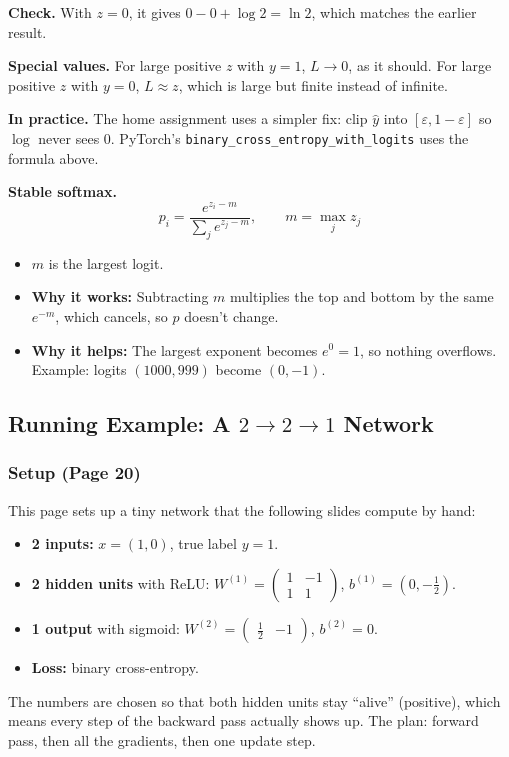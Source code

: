 \textbf{Check.} With $z = 0$, it gives $0 - 0 + \log 2 = \ln 2$, which matches the earlier result.

\textbf{Special values.} For large positive $z$ with $y = 1$, $L \to 0$, as it should. For large positive $z$ with $y = 0$, $L \approx z$, which is large but finite instead of infinite.

\textbf{In practice.} The home assignment uses a simpler fix: clip $\hat{y}$ into $[\varepsilon, 1-\varepsilon]$ so $\log$ never sees 0. PyTorch's \texttt{binary\_cross\_entropy\_with\_logits} uses the formula above.

\textbf{Stable softmax.}
\[
p_i = \frac{e^{z_i - m}}{\sum_j e^{z_j - m}}, \qquad m = \max_j z_j
\]
\begin{itemize}
  \item $m$ is the largest logit.
  \item \textbf{Why it works:} Subtracting $m$ multiplies the top and bottom by the same $e^{-m}$, which cancels, so $p$ doesn't change.
  \item \textbf{Why it helps:} The largest exponent becomes $e^0 = 1$, so nothing overflows. Example: logits $(1000, 999)$ become $(0, -1)$.
\end{itemize}

\subsection*{Running Example: A $2 \to 2 \to 1$ Network}

\subsubsection*{Setup (Page 20)}

This page sets up a tiny network that the following slides compute by hand:
\begin{itemize}
  \item \textbf{2 inputs:} $x = (1, 0)$, true label $y = 1$.
  \item \textbf{2 hidden units} with ReLU: $W^{(1)} = \begin{pmatrix} 1 & -1 \\ 1 & 1 \end{pmatrix}$, $b^{(1)} = (0, -\tfrac12)$.
  \item \textbf{1 output} with sigmoid: $W^{(2)} = \begin{pmatrix} \tfrac12 & -1 \end{pmatrix}$, $b^{(2)} = 0$.
  \item \textbf{Loss:} binary cross-entropy.
\end{itemize}
The numbers are chosen so that both hidden units stay ``alive'' (positive), which means every step of the backward pass actually shows up. The plan: forward pass, then all the gradients, then one update step.

